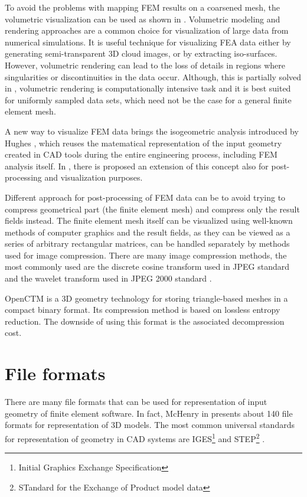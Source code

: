 To avoid the problems with mapping FEM results on a coarsened mesh, the volumetric visualization can be used as shown in \cite{Ueng2004}. Volumetric modeling and rendering approaches are a common choice for visualization of large data from numerical simulations. It is useful technique for visualizing FEA data either by generating semi-transparent 3D cloud images, or by extracting iso-surfaces. However, volumetric rendering can lead to the loss of details in regions where singularities or discontinuities in the data occur. Although, this is partially solved in \cite{Robaina2010}, volumetric rendering is computationally intensive task and it is best suited for uniformly sampled data sets, which need not be the case for a general finite element mesh.

A new way to visualize FEM data brings the isogeometric analysis introduced by Hughes \cite{Hughes2005}, which reuses the matematical representation of the input geometry created in CAD tools during the entire engineering process, including FEM analysis itself. In \cite{Stahl2017}, there is proposed an extension of this concept also for post-processing and visualization purposes.

Different approach for post-processing of FEM data can be to avoid trying to compress geometrical part (the finite element mesh) and compress only the result fields instead. The finite element mesh itself can be visualized using well-known methods of computer graphics and the result fields, as they can be viewed as a series of arbitrary rectangular matrices, can be handled separately by methods used for image compression. There are many image compression methods, the most commonly used are the discrete cosine transform \cite{Watson1994} used in JPEG standard and the wavelet transform used in JPEG 2000 standard \cite{Lui2001}.

OpenCTM \cite{OpenCTM2010} is a 3D geometry technology for storing triangle-based meshes in a compact binary format. Its compression method is based on lossless entropy reduction. The downside of using this format is the associated decompression cost.


\section{File formats}

There are many file formats that can be used for representation of input geometry of finite element software. In fact, McHenry in \cite{McHenry2008} presents about 140 file formats for representation of 3D models. The most common universal standards for representation of geometry in CAD systems are IGES\footnote{Initial Graphics Exchange Specification} \cite{Groton2006} and STEP\footnote{STandard for the Exchange of Product model data} \cite{Pratt2001}.


